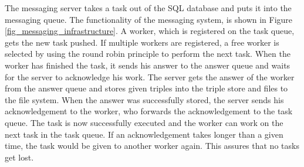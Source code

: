 The messaging server takes a task out of the SQL database and puts it into the messaging queue. 
The functionality of the messaging system, is shown in Figure \ref{fig_messaging_infrastructure}.
A worker, which is registered on the task queue, gets the new task pushed.
If multiple workers are registered, a free worker is selected by using the round robin principle to perform the next task.  
When the worker has finished the task, it sends his answer to the answer queue and waits for the server to acknowledge his work.
The server gets the answer of the worker from the answer queue and stores given triples into the triple store and files to the file system.
When the answer was successfully stored, the server sends his acknowledgement to the worker, who forwards the acknowledgement to the task queue.
The task is now successfully executed and the worker can work on the next task in the task queue.
If an acknowledgement takes longer than a given time, the task would be given to another worker again. This assures that no tasks get lost.